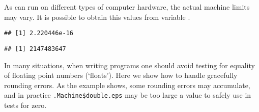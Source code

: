 \documentclass[paper=a4,10pt,div=17,headsepline,BCOR=12mm,twoside,open=right]{scrbook}\usepackage{knitr}
\begin{document}
As \R can run on different types of computer hardware, the actual machine limits may vary. It is possible to obtain this values from variable .

\begin{knitrout}\footnotesize
{}\color{fgcolor}\begin{kframe}
\begin{alltt}
\hlopt{$}
\end{alltt}
\begin{verbatim}
## [1] 2.220446e-16
\end{verbatim}
\begin{alltt}
\hlopt{$}
\end{alltt}
\begin{verbatim}
## [1] 2147483647
\end{verbatim}
\end{kframe}
\end{knitrout}

In many situations, when writing programs one should avoid testing for equality of floating point numbers (`floats'). Here we show how to handle gracefully rounding errors. As the example shows, some rounding errors may accumulate, and in practice \verb|.Machine$double.eps| may be too large a value to safely use in tests for zero.
\end{document}
